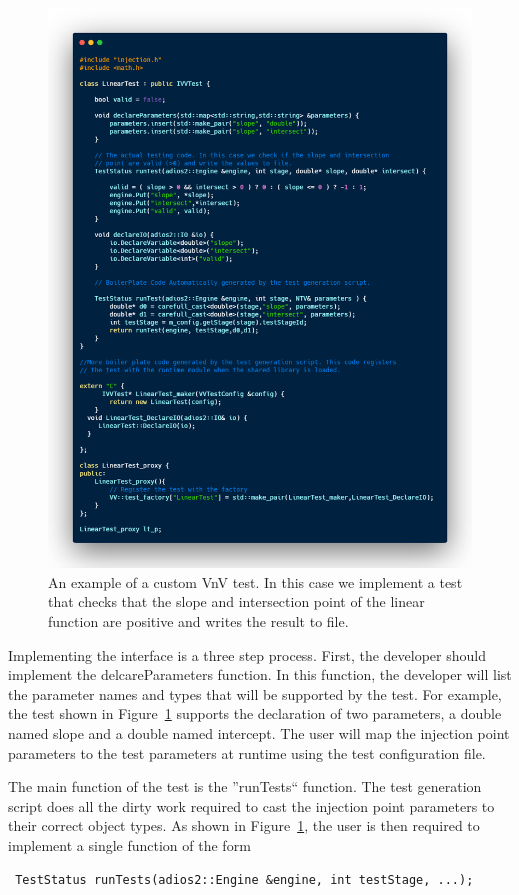 \begin{figure}
 \includegraphics[height=0.9\textheight, width=\textwidth]{./Figures/test-examp.png}
 \caption{An example of a custom VnV test. In this case we implement a test that checks that the slope and intersection point of the linear function are positive and writes
 the result to file. \label{test-examp}}
\end{figure}


Implementing the interface is a three step process. First, the developer should implement the delcareParameters function. In this function, the developer will
list the parameter names and types that will be supported by the test. For example, the test shown in Figure~\ref{test-examp} supports the declaration of 
two parameters, a double named slope and a double named intercept. The user will map the injection point parameters to the test parameters at runtime using 
the test configuration file.

The main function of the test is the ''runTests`` function. The test generation script does all the dirty work required to cast the injection point parameters
to their correct object types. As shown in Figure~\ref{test-examp}, the user is then required to implement a single function of the form
\begin{verbatim}
 TestStatus runTests(adios2::Engine &engine, int testStage, ...);
\end{verbatim}

